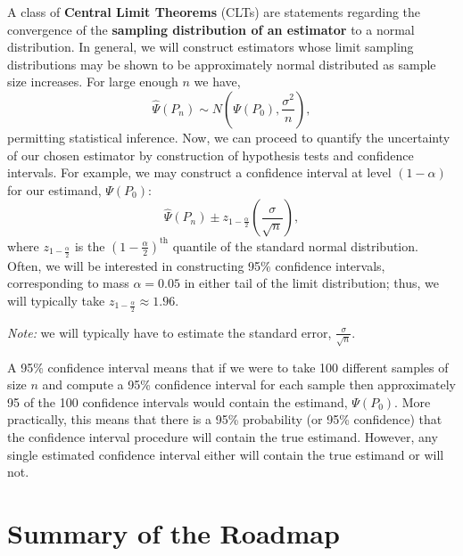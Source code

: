 \documentclass[
  12pt, krantz2,
]{book}
\theoremstyle{definition}
\theoremstyle{definition}
\theoremstyle{definition}
\newcommand{\1}{\mathbbm{1}}
\begin{document}
A class of \textbf{Central Limit Theorems} (CLTs) are statements regarding the
convergence of the \textbf{sampling distribution of an estimator} to a normal
distribution. In general, we will construct estimators whose limit sampling
distributions may be shown to be approximately normal distributed as sample size
increases. For large enough \(n\) we have,
\begin{equation*}
  \hat{\Psi}(P_n) \sim N \left(\Psi(P_0), \frac{\sigma^2}{n}\right),
\end{equation*}
permitting statistical inference. Now, we can proceed to quantify the
uncertainty of our chosen estimator by construction of hypothesis tests and
confidence intervals. For example, we may construct a confidence interval at
level \((1 - \alpha)\) for our estimand, \(\Psi(P_0)\):
\begin{equation*}
  \hat{\Psi}(P_n) \pm z_{1 - \frac{\alpha}{2}}
    \left(\frac{\sigma}{\sqrt{n}}\right),
\end{equation*}
where \(z_{1 - \frac{\alpha}{2}}\) is the \((1 - \frac{\alpha}{2})^\text{th}\)
quantile of the standard normal distribution. Often, we will be interested in
constructing 95\% confidence intervals, corresponding to mass \(\alpha = 0.05\) in
either tail of the limit distribution; thus, we will typically take
\(z_{1 - \frac{\alpha}{2}} \approx 1.96\).

\emph{Note:} we will typically have to estimate the standard error,
\(\frac{\sigma}{\sqrt{n}}\).

A 95\% confidence interval means that if we were to take 100 different samples
of size \(n\) and compute a 95\% confidence interval for each sample then
approximately 95 of the 100 confidence intervals would contain the estimand,
\(\Psi(P_0)\). More practically, this means that there is a 95\% probability
(or 95\% confidence) that the confidence interval procedure will contain the
true estimand. However, any single estimated confidence interval either will
contain the true estimand or will not.

\hypertarget{summary-of-the-roadmap}{%
\section{Summary of the Roadmap}\label{summary-of-the-roadmap}}
\end{document}
